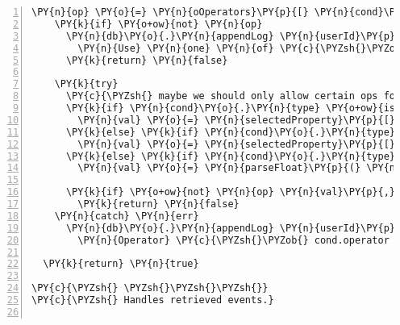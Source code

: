 \begin{Verbatim}[fontsize=\scriptsize,commandchars=\\\{\},numbers=left,firstnumber=1,stepnumber=1]
    \PY{n}{op} \PY{o}{=} \PY{n}{oOperators}\PY{p}{[} \PY{n}{cond}\PY{o}{.}\PY{n}{operator} \PY{p}{]}
    \PY{k}{if} \PY{o+ow}{not} \PY{n}{op}
      \PY{n}{db}\PY{o}{.}\PY{n}{appendLog} \PY{n}{userId}\PY{p}{,} \PY{n}{ruleId}\PY{p}{,} \PY{l+s}{\PYZsq{}}\PY{l+s}{Condition}\PY{l+s}{\PYZsq{}}\PY{p}{,} \PY{l+s}{\PYZdq{}}\PY{l+s}{Unknown operator: \PYZsh{}\PYZob{} cond.operator \PYZcb{}.}
        \PY{n}{Use} \PY{n}{one} \PY{n}{of} \PY{c}{\PYZsh{}\PYZob{} Object.keys( oOperators ).join \PYZsq{}, \PYZsq{} \PYZcb{}\PYZdq{}}
      \PY{k}{return} \PY{n}{false}

    \PY{k}{try}
      \PY{c}{\PYZsh{} maybe we should only allow certain ops for certain types}
      \PY{k}{if} \PY{n}{cond}\PY{o}{.}\PY{n}{type} \PY{o+ow}{is} \PY{l+s}{\PYZsq{}}\PY{l+s}{string}\PY{l+s}{\PYZsq{}}
        \PY{n}{val} \PY{o}{=} \PY{n}{selectedProperty}\PY{p}{[} \PY{l+m+mi}{0} \PY{p}{]}
      \PY{k}{else} \PY{k}{if} \PY{n}{cond}\PY{o}{.}\PY{n}{type} \PY{o+ow}{is} \PY{l+s}{\PYZsq{}}\PY{l+s}{bool}\PY{l+s}{\PYZsq{}}
        \PY{n}{val} \PY{o}{=} \PY{n}{selectedProperty}\PY{p}{[} \PY{l+m+mi}{0} \PY{p}{]}
      \PY{k}{else} \PY{k}{if} \PY{n}{cond}\PY{o}{.}\PY{n}{type} \PY{o+ow}{is} \PY{l+s}{\PYZsq{}}\PY{l+s}{value}\PY{l+s}{\PYZsq{}}
        \PY{n}{val} \PY{o}{=} \PY{n}{parseFloat}\PY{p}{(} \PY{n}{selectedProperty}\PY{p}{[} \PY{l+m+mi}{0} \PY{p}{]} \PY{p}{)} \PY{o}{|}\PY{o}{|} \PY{l+m+mi}{0}

      \PY{k}{if} \PY{o+ow}{not} \PY{n}{op} \PY{n}{val}\PY{p}{,} \PY{n}{cond}\PY{o}{.}\PY{n}{compare}
        \PY{k}{return} \PY{n}{false}
    \PY{n}{catch} \PY{n}{err}
      \PY{n}{db}\PY{o}{.}\PY{n}{appendLog} \PY{n}{userId}\PY{p}{,} \PY{n}{ruleId}\PY{p}{,} \PY{l+s}{\PYZsq{}}\PY{l+s}{Condition}\PY{l+s}{\PYZsq{}}\PY{p}{,} \PY{l+s}{\PYZdq{}}\PY{l+s}{Error: Selector }\PY{l+s}{\PYZsq{}}\PY{l+s}{\PYZsh{}\PYZob{} cond.selector \PYZcb{}}\PY{l+s}{\PYZsq{}}\PY{l+s}{,}
        \PY{n}{Operator} \PY{c}{\PYZsh{}\PYZob{} cond.operator \PYZcb{}, Compare: \PYZsh{}\PYZob{} cond.compare \PYZcb{}\PYZdq{}}
      
  \PY{k}{return} \PY{n}{true}

\PY{c}{\PYZsh{} \PYZsh{}\PYZsh{}\PYZsh{}}
\PY{c}{\PYZsh{} Handles retrieved events.}


\end{Verbatim}
